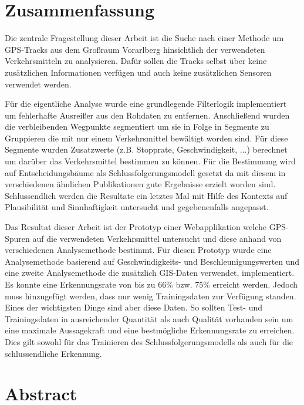 \section*{Zusammenfassung}

Die zentrale Fragestellung dieser Arbeit ist die Suche nach einer Methode um GPS-Tracks  aus dem Großraum Vorarlberg hinsichtlich der verwendeten Verkehrsmitteln zu analysieren. Dafür sollen die Tracks selbst über keine zusätzlichen Informationen verfügen und auch keine zusätzlichen Sensoren verwendet werden.

Für die eigentliche Analyse wurde eine grundlegende Filterlogik implementiert um fehlerhafte Ausreißer aus den Rohdaten zu entfernen. Anschließend wurden die verbleibenden Wegpunkte segmentiert um sie in Folge in Segmente zu Gruppieren die mit nur einem Verkehrsmittel bewältigt worden sind. Für diese Segmente wurden Zusatzwerte (z.B. Stopprate, Geschwindigkeit, ...) berechnet um darüber das Verkehrsmittel bestimmen zu können. Für die Bestimmung wird auf Entscheidungsbäume als Schlussfolgerungsmodell gesetzt da mit diesem in verschiedenen ähnlichen Publikationen gute Ergebnisse erzielt worden sind. Schlussendlich werden die Resultate ein letztes Mal mit Hilfe des Kontexts auf Plausibilität und Sinnhaftigkeit untersucht und gegebenenfalls angepasst.

Das Resultat dieser Arbeit ist der Prototyp einer Webapplikation welche GPS-Spuren auf die verwendeten Verkehrsmittel untersucht und diese anhand von verschiedenen Analysemethode bestimmt. Für diesen Prototyp wurde eine Analysemethode basierend auf Geschwindigkeits- und Beschleunigungswerten und eine zweite Analysemethode die zusätzlich GIS-Daten verwendet, implementiert. Es konnte eine Erkennungsrate von bis zu 66\% bzw. 75\% erreicht werden. Jedoch muss hinzugefügt werden, dass nur wenig Trainingsdaten zur Verfügung standen. Eines der wichtigsten Dinge sind aber diese Daten. So sollten Test- und Trainingsdaten in ausreichender Quantität als auch Qualität vorhanden sein um eine maximale Aussagekraft und eine bestmögliche Erkennungsrate zu erreichen. Dies gilt sowohl für das Trainieren des Schlussfolgerungsmodells als auch für die schlussendliche Erkennung.
\clearpage

\section*{Abstract}

